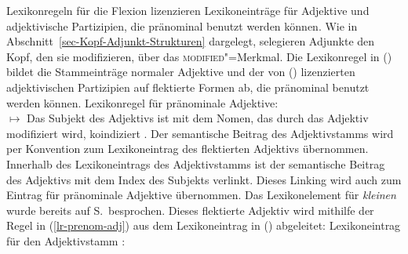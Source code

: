 {Lexikonregeln für die Flexion lizenzieren Lexikoneinträge für Adjektive und adjektivische
Partizipien, die pränominal benutzt werden können. Wie in Abschnitt~\ref{sec-Kopf-Adjunkt-Strukturen}
dargelegt, selegieren Adjunkte den Kopf, den sie modifizieren, über das
\textsc{modified}"=Merkmal. Die Lexikonregel in () bildet die Stammeinträge
normaler Adjektive und der von () lizenzierten adjektivischen Partizipien
auf flektierte Formen ab, die pränominal benutzt werden können.
%
\eas
\label{lr-prenom-adj}%
Lexikonregel für pränominale Adjektive:\\
 $\mapsto$
\zs
%
Das Subjekt des Adjektivs ist mit dem Nomen, das durch das Adjektiv modifiziert wird, koindiziert .
Der semantische Beitrag des Adjektivstamms wird per Konvention zum Lexikoneintrag des flektierten Adjektivs
übernommen. Innerhalb des Lexikoneintrags des Adjektivstamms ist der semantische Beitrag des
Adjektivs mit dem Index des Subjekts verlinkt. Dieses Linking wird auch zum Eintrag für pränominale Adjektive übernommen. Das
Lexikonelement für \emph{kleinen} wurde bereits auf S.\,\pageref{le-kleinen-sem} besprochen. Dieses
flektierte Adjektiv wird mithilfe der Regel in (\ref{lr-prenom-adj}) aus dem Lexikoneintrag in
() abgeleitet:
\eas
\label{le-klein-stem}%
Lexikoneintrag für den Adjektivstamm :\\%
}
